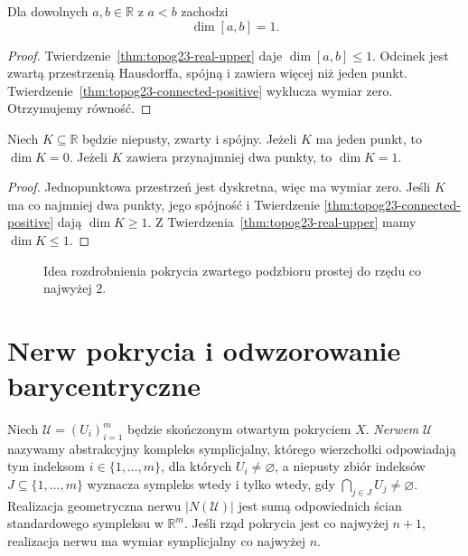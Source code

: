 \begin{twierdzenie}
\label{thm:topog23-interval}
Dla dowolnych \(a,b\in\mathbb R\) z \(a<b\)
zachodzi
\[
 \dim[a,b]=1.
\]
\end{twierdzenie}
\begin{proof}
Twierdzenie~\ref{thm:topog23-real-upper}
daje \(\dim[a,b]\le1\).
Odcinek jest zwartą przestrzenią Hausdorffa,
spójną i zawiera więcej niż jeden punkt.
Twierdzenie~\ref{thm:topog23-connected-positive}
wyklucza wymiar zero.
Otrzymujemy równość.
\end{proof}

\begin{wniosek}
\label{cor:topog23-connected-real}
Niech \(K\subseteq\mathbb R\) będzie niepusty,
zwarty i spójny.
Jeżeli \(K\) ma jeden punkt,
to \(\dim K=0\).
Jeżeli \(K\) zawiera przynajmniej dwa punkty,
to \(\dim K=1\).
\end{wniosek}
\begin{proof}
Jednopunktowa przestrzeń jest dyskretna,
więc ma wymiar zero.
Jeśli \(K\) ma co najmniej dwa punkty,
jego spójność i Twierdzenie
\ref{thm:topog23-connected-positive}
dają \(\dim K\ge1\).
Z Twierdzenia~\ref{thm:topog23-real-upper}
mamy \(\dim K\le1\).
\end{proof}

\begin{figure}[htbp]
\centering
{}
\caption{Idea rozdrobnienia pokrycia zwartego podzbioru
prostej do rzędu co najwyżej \(2\).}
\label{fig:topog23-line-cover}
\end{figure}

\section{Nerw pokrycia i odwzorowanie barycentryczne}
\label{sec:topog23-nerve}

\begin{definicja}
\label{def:topog23-nerve}
Niech \(\mathcal U=(U_i)_{i=1}^{m}\)
będzie skończonym otwartym pokryciem \(X\).
\emph{Nerwem} \(\mathcal U\) nazywamy
abstrakcyjny kompleks symplicjalny,
którego wierzchołki odpowiadają tym indeksom
\(i\in\{1,\ldots,m\}\), dla których \(U_i\neq\varnothing\),
a niepusty zbiór indeksów
\(J\subseteq\{1,\ldots,m\}\)
wyznacza sympleks wtedy i tylko wtedy, gdy
\(\bigcap_{j\in J}U_j\neq\varnothing\).
Realizacja geometryczna nerwu
\(\lvert N(\mathcal U)\rvert\)
jest sumą odpowiednich ścian
standardowego sympleksu w \(\mathbb R^m\).
Jeśli rząd pokrycia jest co najwyżej \(n+1\),
realizacja nerwu ma wymiar symplicjalny
co najwyżej \(n\).
\end{definicja}

